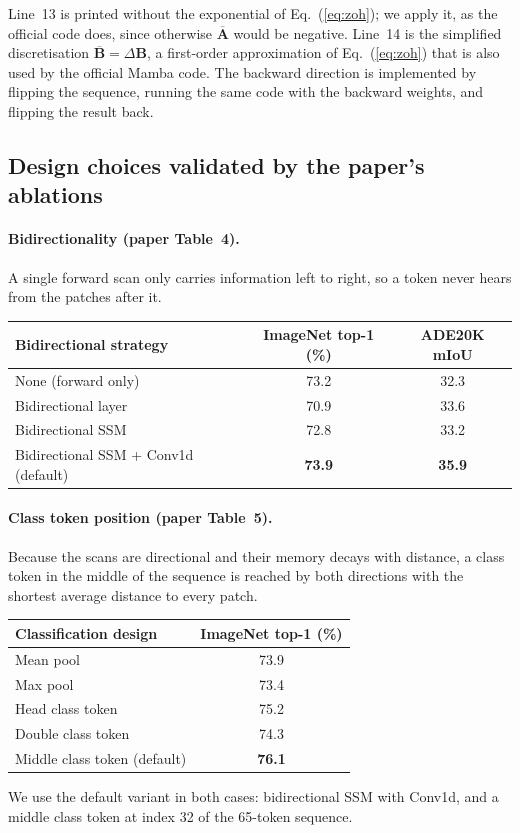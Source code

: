 \documentclass[11pt,a4paper]{article}
\begin{document}
Line~13 is printed without the exponential of Eq.~(\ref{eq:zoh}); we apply it, as the
official code does, since otherwise $\overline{\mathbf{A}}$ would be negative.
Line~14 is the simplified discretisation $\overline{\mathbf{B}}=\Delta\mathbf{B}$,
a first-order approximation of Eq.~(\ref{eq:zoh}) that is also used by the official
Mamba code. The backward direction is implemented by flipping the sequence, running
the same code with the backward weights, and flipping the result back.

\subsection{Design choices validated by the paper's ablations}
\label{sec:ablations}
\paragraph{Bidirectionality (paper Table~4).} A single forward scan only carries
information left to right, so a token never hears from the patches after it.
\begin{center}
\begin{tabular}{lcc}
\toprule
Bidirectional strategy & ImageNet top-1 (\%) & ADE20K mIoU \\
\midrule
None (forward only)                     & 73.2 & 32.3 \\
Bidirectional layer                     & 70.9 & 33.6 \\
Bidirectional SSM                       & 72.8 & 33.2 \\
Bidirectional SSM + Conv1d (default)    & \textbf{73.9} & \textbf{35.9} \\
\bottomrule
\end{tabular}
\end{center}

\paragraph{Class token position (paper Table~5).} Because the scans are directional
and their memory decays with distance, a class token in the middle of the sequence
is reached by both directions with the shortest average distance to every patch.
\begin{center}
\begin{tabular}{lc}
\toprule
Classification design & ImageNet top-1 (\%) \\
\midrule
Mean pool               & 73.9 \\
Max pool                & 73.4 \\
Head class token        & 75.2 \\
Double class token      & 74.3 \\
Middle class token (default) & \textbf{76.1} \\
\bottomrule
\end{tabular}
\end{center}
We use the default variant in both cases: bidirectional SSM with Conv1d, and a
middle class token at index 32 of the 65-token sequence.
\end{document}
